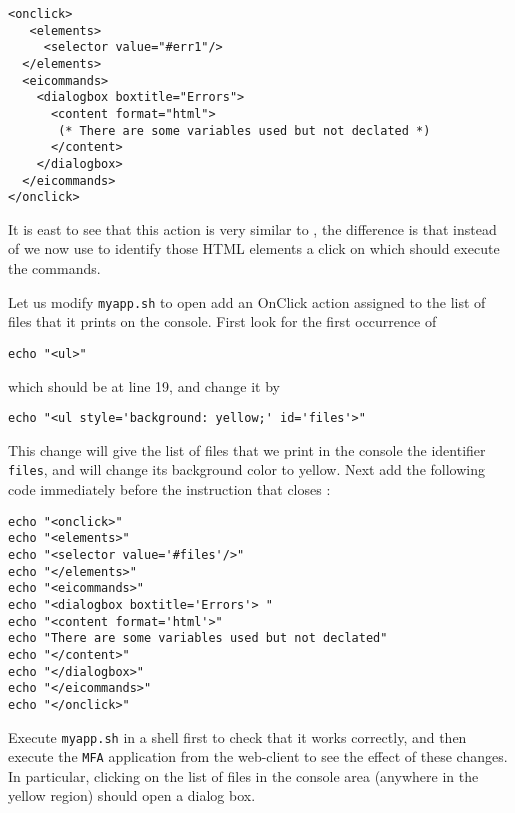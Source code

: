 \begin{lstlisting}
<onclick>
   <elements>
     <selector value="#err1"/>
  </elements>
  <eicommands>
    <dialogbox boxtitle="Errors"> 
      <content format="html">
       (* There are some variables used but not declated *)
      </content>
    </dialogbox>
  </eicommands>
</onclick>
\end{lstlisting}

\medskip
\noindent
It is east to see that this action is very similar to
, the difference is that instead of  we
now use  to identify those HTML elements a click on
which should execute the commands. 

Let us modify \texttt{myapp.sh} to open add an OnClick action assigned
to the list of files that it prints on the console. First look for the
first occurrence of 

\medskip
\begin{lstlisting}[style=script]
echo "<ul>"
\end{lstlisting}

\medskip
\noindent
which should be at line 19, and change it by

\medskip
\begin{lstlisting}[style=script]
echo "<ul style='background: yellow;' id='files'>"
\end{lstlisting}

\medskip
\noindent
This change will give the list of files that we print in the console
the identifier \texttt{files}, and will change its background color to
yellow. Next add the following code immediately before the instruction
that closes :

\medskip
\begin{lstlisting}[style=script]
echo "<onclick>"
echo "<elements>"
echo "<selector value='#files'/>"
echo "</elements>"
echo "<eicommands>"
echo "<dialogbox boxtitle='Errors'> "
echo "<content format='html'>"
echo "There are some variables used but not declated"
echo "</content>"
echo "</dialogbox>"
echo "</eicommands>"
echo "</onclick>"
\end{lstlisting}

\medskip
\noindent
Execute \texttt{myapp.sh} in a shell first to check that it works
correctly, and then execute the \texttt{MFA} application from the
web-client to see the effect of these changes. In particular, clicking
on the list of files in the console area (anywhere in the yellow
region) should open a dialog box.

